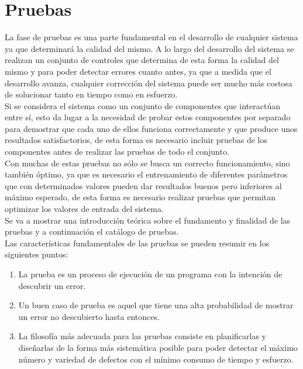 \chapter{Pruebas}

	La fase de pruebas es una parte fundamental en el desarrollo de cualquier sistema ya que determinará la calidad del mismo. A lo largo del desarrollo del sistema se realizan un conjunto de controles que determina de esta forma la calidad del mismo y para poder detectar errores cuanto antes, ya que a medida que el desarrollo avanza, cualquier corrección del sistema puede ser mucho más costosa de solucionar tanto en tiempo como en esfuerzo.\\
	
	Si se considera el sistema como un conjunto de componentes que interactúan entre sí, esto da lugar a la necesidad de probar estos componentes por separado para demostrar que cada uno de ellos funciona correctamente y que produce unos resultados satisfactorios, de esta forma es necesario incluir pruebas de los componentes antes de realizar las pruebas de todo el conjunto.\\
	
	Con muchas de estas pruebas no sólo se busca un correcto funcionamiento, sino también óptimo, ya que es necesario el entrenamiento de diferentes parámetros que con determinados valores pueden dar resultados buenos pero inferiores al máximo esperado, de esta forma es necesario realizar pruebas que permitan optimizar los valores de entrada del sistema.\\
	
	Se va a mostrar una introducción teórica sobre el fundamento y finalidad de las pruebas y a continuación el catálogo de pruebas.\\
	
	Las características fundamentales de las pruebas se pueden resumir en los siguientes puntos:
	
	\begin{enumerate}
		\item La prueba es un proceso de ejecución de un programa con la intención de descubrir un error.
		\item Un buen caso de prueba es aquel que tiene una alta probabilidad de mostrar un error no descubierto hasta entonces.
		\item La filosofía más adecuada para las pruebas consiste en planificarlas y diseñarlas de la forma más sistemática posible para poder detectar el máximo número y variedad de defectos con el mínimo consumo de tiempo y esfuerzo.
	\end{enumerate}


